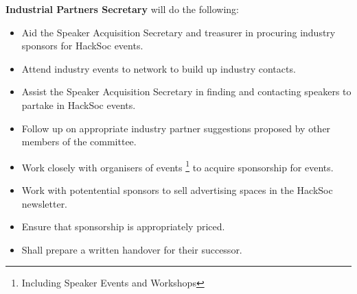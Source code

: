 \begin{subclause}
	\textbf{Industrial Partners Secretary} will do the following:
	\begin{itemize}[label=--,topsep=0em,itemsep=0em]
		\item Aid the Speaker Acquisition Secretary and treasurer in procuring industry sponsors for HackSoc events.
		\item Attend industry events to network to build up industry contacts.
		\item Assist the Speaker Acquisition Secretary in finding and contacting speakers to partake in HackSoc events.
		\item Follow up on appropriate industry partner suggestions proposed by other members of the committee. 
		\item Work closely with organisers of events \footnote{Including Speaker Events and Workshops} to acquire sponsorship for events.
		\item Work with potentential sponsors to sell advertising spaces in the HackSoc newsletter.
		\item Ensure that sponsorship is appropriately priced.
		\item Shall prepare a written handover for their successor.
	\end{itemize}
\end{subclause}

